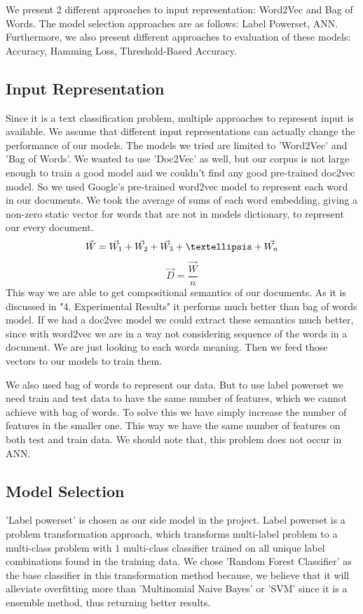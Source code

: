 \documentclass[10pt,twocolumn,letterpaper]{article}
\begin{document}
We present 2 different approaches to input representation: Word2Vec and Bag of Words. The model selection approaches are as follows: Label Powerset, ANN. Furthermore, we also present different approaches to evaluation of these models: Accuracy, Hamming Loss, Threshold-Based Accuracy.

\subsection{Input Representation}
Since it is a text classification problem, multiple approaches to represent input is available. We assume that different input representations can actually change the performance of our models. The models we tried are limited to 'Word2Vec' and 'Bag of Words'. We wanted to use 'Doc2Vec' as well, but our corpus is not large enough to train a good model and we couldn't find any good pre-trained doc2vec model. So we used Google's pre-trained word2vec model\cite{word2vecmodel} to represent each word in our documents. We took the average of sums of each word embedding, giving a non-zero static vector for words that are not in models dictionary, to represent our every document.
\begin{equation}
\vec{W} = \vec{W_1} + \vec{W_2} + \vec{W_3} + \textellipsis + \vec{W_n}
\end{equation}	
\begin{equation}
\vec{D} = \frac{\vec{W}}{n}
\end{equation}
This way we are able to get compositional semantics of our documents. As it is discussed in "4. Experimental Results" it performs much better than bag of words model. If we had a doc2vec model we could extract these semantics much better, since with word2vec we are in a way not considering sequence of the words in a document. We are just looking to each words meaning. Then we feed those vectors to our models to train them. 

We also used bag of words to represent our data. But to use label powerset we need train and test data to have the same number of features, which we cannot achieve with bag of words. To solve this we have simply increase the number of features in the smaller one. This way we have the same number of features on both test and train data. We should note that, this problem does not occur in ANN. 

\subsection{Model Selection}
'Label powerset' is chosen as our side model in the project. Label powerset is a problem transformation approach, which transforms multi-label problem to a multi-class problem with 1 multi-class classifier trained on all unique label combinations found in the training data. We chose 'Random Forest Classifier' as the base classifier in this transformation method because, we believe that it will alleviate overfitting more than 'Multinomial Naive Bayes' or 'SVM' since it is a ensemble method, thus returning better results. 
\end{document}
